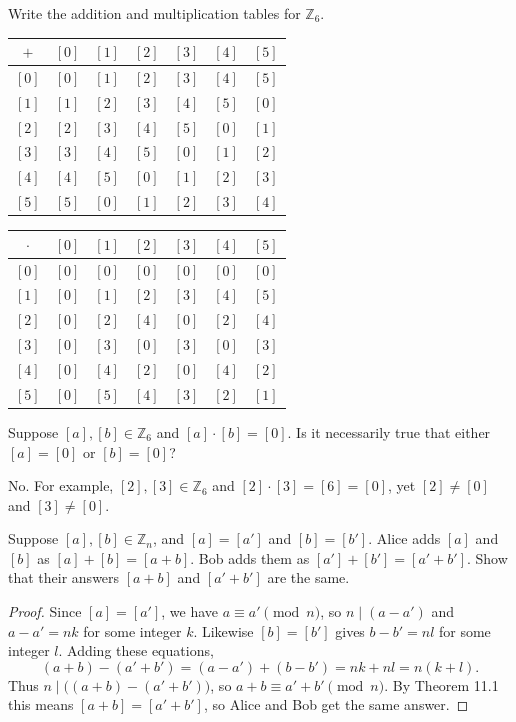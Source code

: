 \documentclass[DIN, pagenumber=false, fontsize=11pt, parskip=half]{scrartcl}
\begin{document}
\begin{problems}
    \problem Write the addition and multiplication tables for $\mathbb{Z}_6$.
    \answer
    \begin{center}
        \begin{tabular}{c|cccccc}
            $+$ & $[0]$ & $[1]$ & $[2]$ & $[3]$ & $[4]$ & $[5]$ \\
            \hline
            $[0]$ & $[0]$ & $[1]$ & $[2]$ & $[3]$ & $[4]$ & $[5]$ \\
            $[1]$ & $[1]$ & $[2]$ & $[3]$ & $[4]$ & $[5]$ & $[0]$ \\
            $[2]$ & $[2]$ & $[3]$ & $[4]$ & $[5]$ & $[0]$ & $[1]$ \\
            $[3]$ & $[3]$ & $[4]$ & $[5]$ & $[0]$ & $[1]$ & $[2]$ \\
            $[4]$ & $[4]$ & $[5]$ & $[0]$ & $[1]$ & $[2]$ & $[3]$ \\
            $[5]$ & $[5]$ & $[0]$ & $[1]$ & $[2]$ & $[3]$ & $[4]$ \\
        \end{tabular}
        \qquad
        \begin{tabular}{c|cccccc}
            $\cdot$ & $[0]$ & $[1]$ & $[2]$ & $[3]$ & $[4]$ & $[5]$ \\
            \hline
            $[0]$ & $[0]$ & $[0]$ & $[0]$ & $[0]$ & $[0]$ & $[0]$ \\
            $[1]$ & $[0]$ & $[1]$ & $[2]$ & $[3]$ & $[4]$ & $[5]$ \\
            $[2]$ & $[0]$ & $[2]$ & $[4]$ & $[0]$ & $[2]$ & $[4]$ \\
            $[3]$ & $[0]$ & $[3]$ & $[0]$ & $[3]$ & $[0]$ & $[3]$ \\
            $[4]$ & $[0]$ & $[4]$ & $[2]$ & $[0]$ & $[4]$ & $[2]$ \\
            $[5]$ & $[0]$ & $[5]$ & $[4]$ & $[3]$ & $[2]$ & $[1]$ \\
        \end{tabular}
    \end{center}

    \problem Suppose $[a],[b] \in \mathbb{Z}_6$ and $[a] \cdot [b] = [0]$. Is it necessarily true that either $[a] = [0]$ or $[b] = [0]$?

    \answer No. For example, $[2],[3] \in \mathbb{Z}_6$ and $[2] \cdot [3] = [6] = [0]$, yet $[2] \neq [0]$ and $[3] \neq [0]$. 

    \problem Suppose $[a],[b] \in \mathbb{Z}_n$, and $[a] = [a']$ and $[b] = [b']$. Alice adds $[a]$ and $[b]$ as $[a]+[b] = [a+b]$. Bob adds them as $[a']+[b'] = [a'+b']$. Show that their answers $[a+b]$ and $[a'+b']$ are the same.
    \begin{proof}
        Since $[a] = [a']$, we have $a \equiv a' \pmod{n}$, so $n \mid (a - a')$ and $a - a' = nk$ for some integer $k$. Likewise $[b] = [b']$ gives $b - b' = nl$ for some integer $l$. Adding these equations,
        \[
            (a+b) - (a'+b') = (a - a') + (b - b') = nk + nl = n(k+l).
        \]
        Thus $n \mid \big((a+b) - (a'+b')\big)$, so $a + b \equiv a' + b' \pmod{n}$. By Theorem 11.1 this means $[a+b] = [a'+b']$, so Alice and Bob get the same answer.
    \end{proof}
\end{problems}
\end{document}
